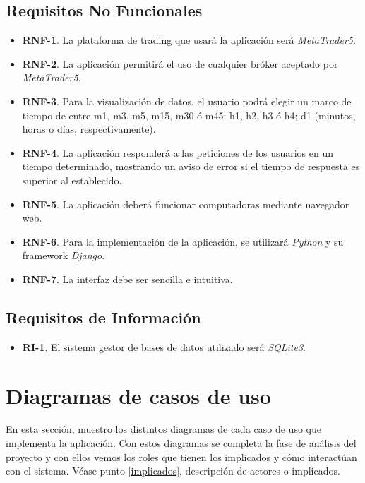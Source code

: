 \subsection{Requisitos No Funcionales}

\begin{itemize}
	\item \textbf{RNF-1}. La plataforma de trading que usará la aplicación será \textit{MetaTrader5}.
	\item \textbf{RNF-2}. La aplicación permitirá el uso de cualquier bróker aceptado por \textit{MetaTrader5}.
	\item \textbf{RNF-3}. Para la visualización de datos, el usuario podrá elegir un marco de tiempo de entre m1, m3, m5, m15, m30 ó m45; h1, h2, h3 ó h4; d1 (minutos, horas o días, respectivamente).
	\item \textbf{RNF-4}. La aplicación responderá a las peticiones de los usuarios en un tiempo determinado,
	mostrando un aviso de error si el tiempo de respuesta es superior al establecido.
	\item \textbf{RNF-5}. La aplicación deberá funcionar computadoras mediante navegador web.
	\item \textbf{RNF-6}. Para la implementación de la aplicación, se utilizará \textit{Python} y su framework \textit{Django}.
	\item \textbf{RNF-7}. La interfaz debe ser sencilla e intuitiva.
\end{itemize}

\subsection{Requisitos de Información}

\begin{itemize}
	\item \textbf{RI-1}. El sistema gestor de bases de datos utilizado será \textit{SQLite3}.
\end{itemize}

\section{Diagramas de casos de uso}

En esta sección, muestro los distintos diagramas de cada caso de uso que implementa la aplicación. Con estos diagramas se completa la fase de análisis del proyecto y con ellos vemos los roles que tienen los implicados y cómo interactúan con el sistema. Véase punto \ref{implicados}, descripción de actores o implicados.

